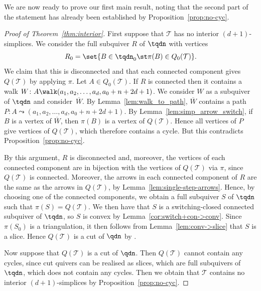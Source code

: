 We are now ready to prove our first main result, noting that the second part of the statement has already been established by Proposition~\ref{prop:no-cyc}.

\begin{proof}[Proof of Theorem~\ref{thm:interior}]
First suppose that $\mathcal{T}$ has no interior $(d+1)$-simplices. We consider the full subquiver $R$ of $\tqdn$ with vertices \[R_{0} = \set{ B \in \tqdn_{0} \st \pi(B) \in Q_{0}(\mathcal{T})}.\] We claim that this is disconnected and that each connected component gives $Q(\mathcal{T})$ by applying $\pi$. Let $A \in Q_{0}(\mathcal{T})$. If $R$ is connected then it contains a walk $W \colon A \walk (a_{1}, a_{2}, \dots, a_{d}, a_{0} + n + 2d + 1)$. We consider $W$ as a subquiver of $\tqdn$ and consider~$\overline{W}$. By Lemma~\ref{lem:walk_to_path}, $\overline{W}$ contains a path $P \colon A \leadsto (a_{1}, a_{2}, \dots, a_{d}, a_{0} + n + 2d + 1)$. By Lemma~\ref{lem:simp_arrow_switch}, if $B$ is a vertex of $\overline{W}$, then $\pi(B)$ is a vertex of $Q(\mathcal{T})$. Hence all vertices of $P$ give vertices of $Q(\mathcal{T})$, which therefore contains a cycle. But this contradicts Proposition~\ref{prop:no-cyc}.

By this argument, $R$ is disconnected and, moreover, the vertices of each connected component are in bijection with the vertices of $Q(\mathcal{T})$ via $\pi$, since $Q(\mathcal{T})$ is connected. Moreover, the arrows in each connected component of $R$ are the same as the arrows in $Q(\mathcal{T})$, by Lemma~\ref{lem:single-step-arrows}. Hence, by choosing one of the connected components, we obtain a full subquiver $S$ of $\tqdn$ such that $\pi(S) = Q(\mathcal{T})$. We then have that $S$ is a switching-closed connected subquiver of $\tqdn$, so $S$ is convex by Lemma~\ref{cor:switch+con->conv}. Since $\pi(S_{0})$ is a triangulation, it then follows from Lemma~\ref{lem:conv->slice} that $S$ is a slice. Hence $Q(\mathcal{T})$ is a cut of $\qdn$ by \cite[Theorem 5.24]{io}.

Now suppose that $Q(\mathcal{T})$ is a cut of $\qdn$. Then $Q(\mathcal{T})$ cannot contain any cycles, since cut quivers can be realised as slices, which are full subquivers of $\tqdn$, which does not contain any cycles. Then we obtain that $\mathcal{T}$ contains no interior $(d + 1)$-simplices by Proposition~\ref{prop:no-cyc}.
\end{proof}
